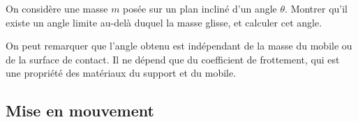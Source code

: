 \documentclass[11pt,fleqn]{book} %
\begin{document}
\begin{capex}
On considère une masse $m$ posée sur un plan incliné d'un angle $\theta$. Montrer qu'il existe un angle limite au-delà duquel la masse glisse, et calculer cet angle.
\end{capex} 


On peut remarquer que l'angle obtenu est indépendant de la masse du mobile ou de la surface de contact. Il ne dépend que du coefficient de frottement, qui est une propriété des matériaux du support et du mobile.

\subsection{Mise en mouvement}
\end{document}
